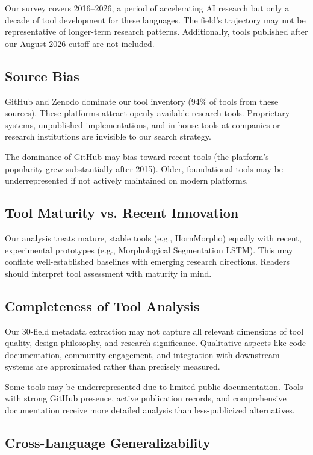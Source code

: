 \documentclass[12pt,a4paper]{article}
\theoremstyle{plain}
\theoremstyle{definition}
\begin{document}
Our survey covers 2016--2026, a period of accelerating AI research but only a decade of tool development for these languages. The field's trajectory may not be representative of longer-term research patterns. Additionally, tools published after our August 2026 cutoff are not included.

\subsection{Source Bias}

GitHub and Zenodo dominate our tool inventory (94\% of tools from these sources). These platforms attract openly-available research tools. Proprietary systems, unpublished implementations, and in-house tools at companies or research institutions are invisible to our search strategy.

The dominance of GitHub may bias toward recent tools (the platform's popularity grew substantially after 2015). Older, foundational tools may be underrepresented if not actively maintained on modern platforms.

\subsection{Tool Maturity vs. Recent Innovation}

Our analysis treats mature, stable tools (e.g., HornMorpho) equally with recent, experimental prototypes (e.g., Morphological Segmentation LSTM). This may conflate well-established baselines with emerging research directions. Readers should interpret tool assessment with maturity in mind.

\subsection{Completeness of Tool Analysis}

Our 30-field metadata extraction may not capture all relevant dimensions of tool quality, design philosophy, and research significance. Qualitative aspects like code documentation, community engagement, and integration with downstream systems are approximated rather than precisely measured.

Some tools may be underrepresented due to limited public documentation. Tools with strong GitHub presence, active publication records, and comprehensive documentation receive more detailed analysis than less-publicized alternatives.

\subsection{Cross-Language Generalizability}
\end{document}
